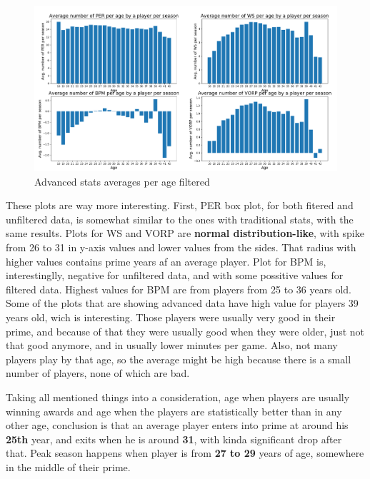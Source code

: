\documentclass[a4paper]{article}
\begin{document}
\begin{figure}[h!]
\begin{center}
\includegraphics[scale=0.3]{advanced_stats_per_age_filtered.png}
\end{center}
\caption{Advanced stats averages per age filtered}
\label{plt:advanced_age_filtered}
\end{figure}

These plots are way more interesting. First, PER box plot, for both fitered and unfiltered data, is somewhat similar to the ones with traditional stats, with the same results. Plots for WS and VORP are \textbf{normal distribution-like}, with spike from 26 to 31 in y-axis values and lower values from the sides. That radius with higher values contains prime years af an average player. Plot for BPM is, interestinglly, negative for unfiltered data, and with some possitive values for filtered data. Highest values for BPM are from players from 25 to 36 years old. Some of the plots that are showing advanced data have high value for players 39 years old, wich is interesting. Those players were usually very good in their prime, and because of that they were usually good when they were older, just not that good anymore, and in usually lower minutes per game. Also, not many players play by that age, so the average might be high because there is a small number of players, none of which are bad.

Taking all mentioned things into a consideration, age when players are usually winning awards and age when the players are statistically better than in any other age, conclusion is that an average player enters into prime at around his \textbf{25th} year, and exits when he is around \textbf{31}, with kinda significant drop after that. Peak season happens when player is from \textbf{27 to 29} years of age, somewhere in the middle of their prime.
\end{document}
